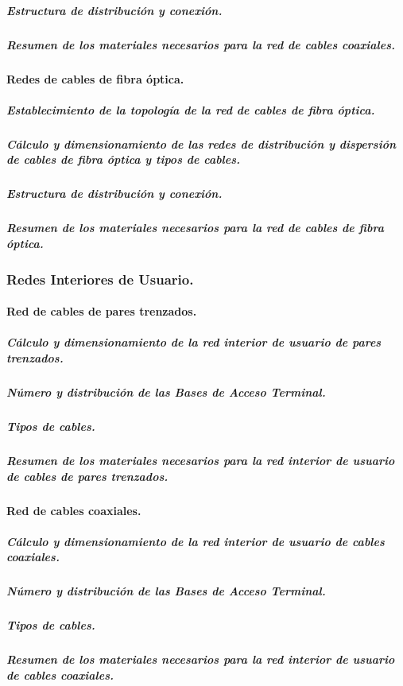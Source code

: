 \subparagraph{Estructura de distribución y conexión.}
\subparagraph{Resumen de los materiales necesarios para la red de cables coaxiales.}
\paragraph{Redes de cables de fibra óptica.}
\subparagraph{Establecimiento de la topología de la red de cables de fibra óptica.}
\subparagraph{Cálculo y dimensionamiento de las redes de distribución y dispersión de cables de fibra óptica y tipos de cables.}
\subparagraph{Estructura de distribución y conexión.}
\subparagraph{Resumen de los materiales necesarios para la red de cables de fibra óptica.}
\subsubsection{Redes Interiores de Usuario.}
\paragraph{Red de cables de pares trenzados.}
\subparagraph{Cálculo y dimensionamiento de la red interior de usuario de pares trenzados.}
\subparagraph{Número y distribución de las Bases de Acceso Terminal.}
\subparagraph{Tipos de cables.}
\subparagraph{Resumen de los materiales necesarios para la red interior de usuario de cables de pares trenzados.}
\paragraph{Red de cables coaxiales.}
\subparagraph{Cálculo y dimensionamiento de la red interior de usuario de cables coaxiales.}
\subparagraph{Número y distribución de las Bases de Acceso Terminal.}
\subparagraph{Tipos de cables.}
\subparagraph{Resumen de los materiales necesarios para la red interior de usuario de cables coaxiales.}